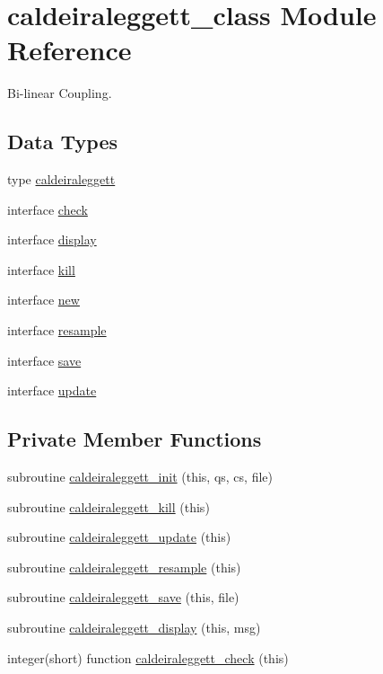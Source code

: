\hypertarget{classcaldeiraleggett__class}{\section{caldeiraleggett\+\_\+class Module Reference}
\label{classcaldeiraleggett__class}
}


Bi-\/linear Coupling.  


\subsection*{Data Types}
\begin{DoxyCompactItemize}
\item 
type \hyperlink{structcaldeiraleggett__class_1_1caldeiraleggett}{caldeiraleggett}
\item 
interface \hyperlink{interfacecaldeiraleggett__class_1_1check}{check}
\item 
interface \hyperlink{interfacecaldeiraleggett__class_1_1display}{display}
\item 
interface \hyperlink{interfacecaldeiraleggett__class_1_1kill}{kill}
\item 
interface \hyperlink{interfacecaldeiraleggett__class_1_1new}{new}
\item 
interface \hyperlink{interfacecaldeiraleggett__class_1_1resample}{resample}
\item 
interface \hyperlink{interfacecaldeiraleggett__class_1_1save}{save}
\item 
interface \hyperlink{interfacecaldeiraleggett__class_1_1update}{update}
\end{DoxyCompactItemize}
\subsection*{Private Member Functions}
\begin{DoxyCompactItemize}
\item 
subroutine \hyperlink{classcaldeiraleggett__class_ab3b1ec288a61d42278a85482babb0913}{caldeiraleggett\+\_\+init} (this, qs, cs, file)
\item 
subroutine \hyperlink{classcaldeiraleggett__class_af9a2c9816cca2f57af7ee0d70d8050a0}{caldeiraleggett\+\_\+kill} (this)
\item 
subroutine \hyperlink{classcaldeiraleggett__class_ae3a46b1ef895a80ba08d1af758cdd927}{caldeiraleggett\+\_\+update} (this)
\item 
subroutine \hyperlink{classcaldeiraleggett__class_a4efdd502f2545f5b698aad89810c233e}{caldeiraleggett\+\_\+resample} (this)
\item 
subroutine \hyperlink{classcaldeiraleggett__class_a42a7d0ec6aaea222ef6b5ea714b74b43}{caldeiraleggett\+\_\+save} (this, file)
\item 
subroutine \hyperlink{classcaldeiraleggett__class_a79d3bd20c691bdc5c9b1e471a66f508c}{caldeiraleggett\+\_\+display} (this, msg)
\item 
integer(short) function \hyperlink{classcaldeiraleggett__class_ac0b748f33410a38bf05f9aea13660189}{caldeiraleggett\+\_\+check} (this)
\end{DoxyCompactItemize}


